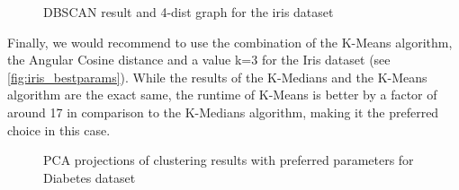 \begin{figure}[H]
	\caption{DBSCAN result and 4-dist graph for the iris dataset} 
	\label{dbscaniris}
\end{figure}

Finally, we would recommend to use the combination of the K-Means algorithm, the Angular Cosine distance and a value k=3 for the Iris dataset (see \autoref{fig:iris_bestparams}). While the results of the K-Medians and the K-Means algorithm are the exact same, the runtime of K-Means is better by a factor of around 17 in comparison to the K-Medians algorithm, making it the preferred choice in this case. \\

\begin{figure}[H]
	\centering
	\caption{PCA projections of clustering results with preferred parameters for Diabetes dataset}
	\label{fig:iris_bestparams}
\end{figure}

